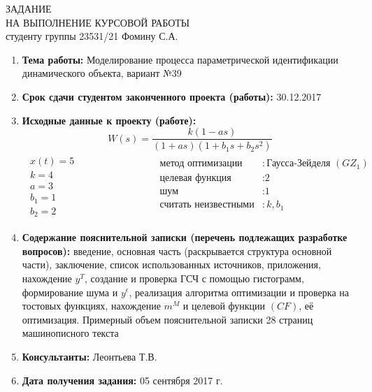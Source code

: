 \newpage
\thispagestyle{empty}
\begin{center}
    ЗАДАНИЕ\\
    НА ВЫПОЛНЕНИЕ КУРСОВОЙ РАБОТЫ \\[1ex]
    студенту группы 23531/21 Фомину С.А.
\end{center}

\vspace{0.5cm}

\begin{enumerate}
    \item
        \textbf{Тема работы:} Моделирование процесса параметрической идентификации динамического объекта, вариант №39
    \item
        \textbf{Срок сдачи студентом законченного проекта (работы):} 30.12.2017
    \item
        \textbf{Исходные данные к проекту (работе):}
            $$W(s) = \frac{k(1-as)}{(1+as)(1+b_1s+b_2s^2)}$$
            $$
                \begin{matrix}
                    \begin{aligned}
                        x(t) = 5 \\
                        k = 4 \\
                        a = 3 \\
                        b_1 = 1 \\
                        b_2 = 2
                    \end{aligned}
                    &
                    \hspace{3cm}
                    \begin{aligned}
                        \text{метод оптимизации}&: \text{Гаусса-Зейделя $(GZ_1)$} \\
                        \text{целевая функция}&: \text{2} \\
                        \text{шум}&: \text{1} \\
                        \text{считать неизвестными}&: \text{$k, b_1$} \\
                    \end{aligned}
                \end{matrix}
            $$
    \item
        \textbf{Содержание пояснительной записки (перечень подлежащих разработке вопросов):} введение, основная часть (раскрывается структура основной части), заключение, список использованных источников, приложения, нахождение $y^T$, создание и проверка ГСЧ с помощью гистограмм, формирование шума и $y^\epsilon$, реализация алгоритма оптимизации и проверка на тостовых функциях, нахождение $m^M$ и целевой функции $(CF)$, её оптимизация. Примерный объем пояснительной записки 28 страниц машинописного текста
    \item
        \textbf{Консультанты:} Леонтьева Т.В.
    \item
        \textbf{Дата получения задания:} 05 сентября 2017 г.
\end{enumerate}

